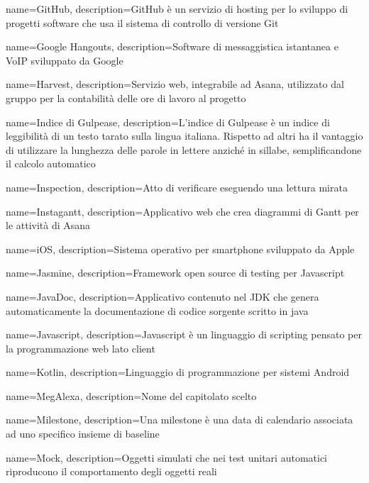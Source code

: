 {
name={GitHub},
description={GitHub è un servizio di hosting per lo sviluppo di progetti software che usa il sistema di controllo di versione Git}
}

{
name={Google Hangouts},
description={Software di messaggistica istantanea e VoIP sviluppato da Google}
}

{
	name={Harvest},
	description={Servizio web, integrabile ad Asana, utilizzato dal gruppo per la contabilità delle ore di lavoro al progetto}
}

{
name={Indice di Gulpease},
description={L’indice di Gulpease è un indice di leggibilità di un testo tarato sulla lingua italiana. Rispetto ad altri ha il vantaggio di utilizzare la lunghezza delle
parole in lettere anziché in sillabe, semplificandone il calcolo automatico}
}

{
name={Inspection},
description={Atto di verificare eseguendo una lettura mirata}
}

{
name={Instagantt},
description={Applicativo web che crea diagrammi di Gantt per le attività di Asana}
}

{
name={iOS},
description={Sistema operativo per smartphone sviluppato da Apple}
}

{
	name={Jasmine},
	description={Framework open source di testing per Javascript}
}

{
	name={JavaDoc},
	description={Applicativo contenuto nel JDK che genera automaticamente la documentazione di codice sorgente scritto in java}
}

{
name={Javascript},
description={Javascript è un linguaggio di scripting pensato per la programmazione web lato client}
}

{
name={Kotlin},
description={Linguaggio di programmazione per sistemi Android}
}

{
name={MegAlexa},
description={Nome del capitolato scelto}
}

{
name={Milestone},
description={Una milestone è una data di calendario associata ad uno specifico insieme di baseline}
}

{
	name={Mock},
	description={Oggetti simulati che nei test unitari automatici riproducono il comportamento degli oggetti reali}
}

